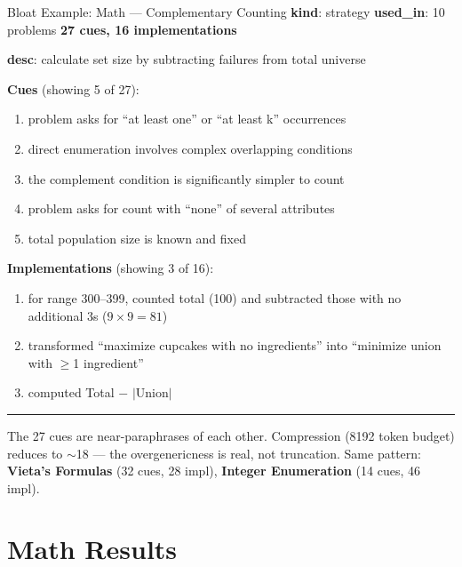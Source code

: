 \documentclass[10pt]{beamer}
\begin{document}
\begin{frame}{Bloat Example: \textcolor{mathgreen}{Math} --- Complementary Counting}
  \scriptsize
  \textbf{kind}: strategy \quad \textbf{used\_in}: 10 problems \quad \textbf{27 cues, 16 implementations}

  \textbf{desc}: calculate set size by subtracting failures from total universe

  \vspace{0.3em}
  \textbf{Cues} (showing 5 of 27):
  \begin{enumerate}\setlength\itemsep{0pt}
    \item problem asks for ``at least one'' or ``at least k'' occurrences
    \item direct enumeration involves complex overlapping conditions
    \item the complement condition is significantly simpler to count
    \item problem asks for count with ``none'' of several attributes
    \item total population size is known and fixed
  \end{enumerate}

  \textbf{Implementations} (showing 3 of 16):
  \begin{enumerate}\setlength\itemsep{0pt}
    \item for range 300--399, counted total (100) and subtracted those with no additional 3s ($9 \times 9 = 81$)
    \item transformed ``maximize cupcakes with no ingredients'' into ``minimize union with $\geq$1 ingredient''
    \item computed Total $-$ $|$Union$|$
  \end{enumerate}

  \vspace{0.3em}
  \hrule
  \vspace{0.2em}
  \footnotesize The 27 cues are near-paraphrases of each other. Compression (8192 token budget) reduces to $\sim$18 --- the overgenericness is real, not truncation. Same pattern: \textbf{Vieta's Formulas} (32 cues, 28 impl), \textbf{Integer Enumeration} (14 cues, 46 impl).
\end{frame}

\section{Math Results}
\end{document}
